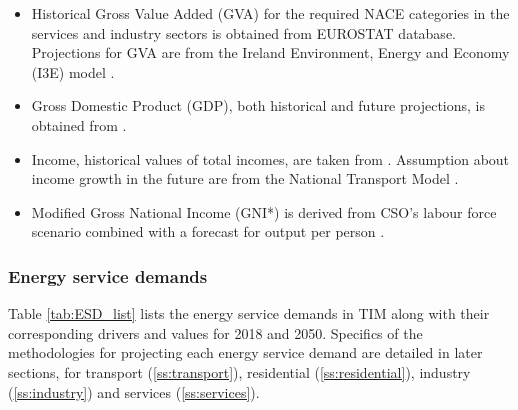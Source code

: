 \documentclass[gmd,manuscript]{copernicus}
\begin{document}
\begin{itemize}

 \item Historical Gross Value Added (GVA) for the required NACE categories in the services and industry sectors is obtained from EUROSTAT database. Projections for GVA are from the Ireland Environment, Energy and Economy (I3E) model \citep{Yakut2020}.
 
 \item Gross Domestic Product (GDP), both historical and future projections, is obtained from \citet{OECD2018}. 
 
 \item Income, historical values of total incomes, are taken from \citet{CSOincome}. Assumption about income growth in the future are from the National Transport Model \citep{AECOMIrelandLimited2019}. 
 
 \item Modified Gross National Income (GNI*) is derived from CSO's labour force scenario combined with a forecast for output per person \citep{cso_lf}. 

\end{itemize}

\subsubsection{Energy service demands}
Table \ref{tab:ESD_list} lists the energy service demands in TIM along with their corresponding drivers and values for 2018 and 2050. Specifics of the methodologies for projecting each energy service demand are detailed in later sections, for transport (\ref{ss:transport}), residential (\ref{ss:residential}), industry (\ref{ss:industry}) and services (\ref{ss:services}). 
\end{document}
